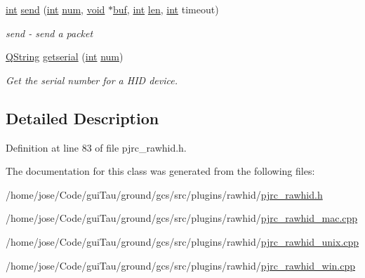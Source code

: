 \begin{DoxyCompactItemize}
\hyperlink{ioapi_8h_a787fa3cf048117ba7123753c1e74fcd6}{int} \hyperlink{group___raw_h_i_d_plugin_gac3f9d785ee170f6331278e39c6f43c00}{send} (\hyperlink{ioapi_8h_a787fa3cf048117ba7123753c1e74fcd6}{int} \hyperlink{glext_8h_abb50fc1ead3a02a46fb52daa2045f95c}{num}, \hyperlink{group___u_a_v_objects_plugin_ga444cf2ff3f0ecbe028adce838d373f5c}{void} $\ast$\hyperlink{ioapi_8h_a8ad8a13c88886b9f623034ff88570adb}{buf}, \hyperlink{ioapi_8h_a787fa3cf048117ba7123753c1e74fcd6}{int} \hyperlink{glext_8h_ac759c9f8b2506530e65879e566e59f02}{len}, \hyperlink{ioapi_8h_a787fa3cf048117ba7123753c1e74fcd6}{int} timeout)
\begin{DoxyCompactList}\small\item\em send -\/ send a packet \end{DoxyCompactList}\item 
\hyperlink{group___u_a_v_objects_plugin_gab9d252f49c333c94a72f97ce3105a32d}{Q\-String} \hyperlink{group___raw_h_i_d_plugin_gad851d6feef1ebb7256895d5aab3ed3a4}{getserial} (\hyperlink{ioapi_8h_a787fa3cf048117ba7123753c1e74fcd6}{int} \hyperlink{glext_8h_abb50fc1ead3a02a46fb52daa2045f95c}{num})
\begin{DoxyCompactList}\small\item\em Get the serial number for a H\-I\-D device. \end{DoxyCompactList}\end{DoxyCompactItemize}


\subsection{Detailed Description}


Definition at line 83 of file pjrc\-\_\-rawhid.\-h.



The documentation for this class was generated from the following files\-:\begin{DoxyCompactItemize}
\item 
/home/jose/\-Code/gui\-Tau/ground/gcs/src/plugins/rawhid/\hyperlink{pjrc__rawhid_8h}{pjrc\-\_\-rawhid.\-h}\item 
/home/jose/\-Code/gui\-Tau/ground/gcs/src/plugins/rawhid/\hyperlink{pjrc__rawhid__mac_8cpp}{pjrc\-\_\-rawhid\-\_\-mac.\-cpp}\item 
/home/jose/\-Code/gui\-Tau/ground/gcs/src/plugins/rawhid/\hyperlink{pjrc__rawhid__unix_8cpp}{pjrc\-\_\-rawhid\-\_\-unix.\-cpp}\item 
/home/jose/\-Code/gui\-Tau/ground/gcs/src/plugins/rawhid/\hyperlink{pjrc__rawhid__win_8cpp}{pjrc\-\_\-rawhid\-\_\-win.\-cpp}\end{DoxyCompactItemize}
